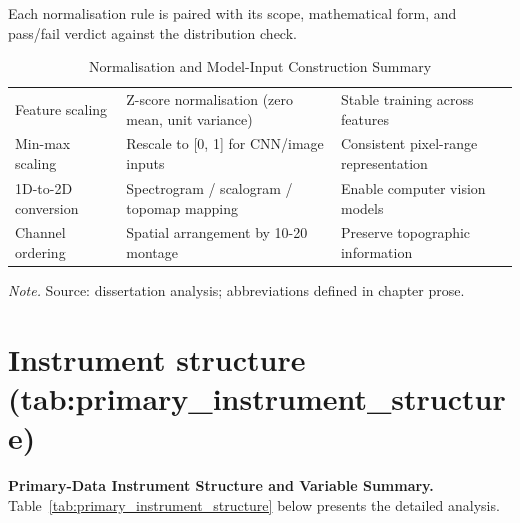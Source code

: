 {\tablestripes\tablefontsize

\noindent Each normalisation rule is paired with its scope, mathematical form, and pass/fail verdict against the distribution check.

\begin{xltabular}{\textwidth}{@{} l L L @{}}
\caption[Normalisation and Model-Input Construction Summary]{Normalisation and Model-Input Construction Summary}\label{tab:normalization_summary} \\
\toprule
{} &  &  \\
\midrule
\endfirsthead
\endhead
\bottomrule
\endlastfoot
Feature scaling & Z-score normalisation (zero mean, unit variance) & Stable training across features \\
Min-max scaling & Rescale to [0, 1] for CNN/image inputs & Consistent pixel-range representation \\
1D-to-2D conversion & Spectrogram / scalogram / topomap mapping & Enable computer vision models \\
Channel ordering & Spatial arrangement by 10-20 montage & Preserve topographic information \\
\end{xltabular}}
\vspace{0.3em}\noindent\textit{Note.} Source: dissertation analysis; abbreviations defined in chapter prose.


\section{Instrument structure (tab:primary\_\allowbreak instrument\_\allowbreak structure)}
\label{sec:appendix_ch4_tab_primary_instrument_structure}


\noindent\textbf{Primary-Data Instrument Structure and Variable Summary.} Table~\ref{tab:primary_instrument_structure} below presents the detailed analysis.

